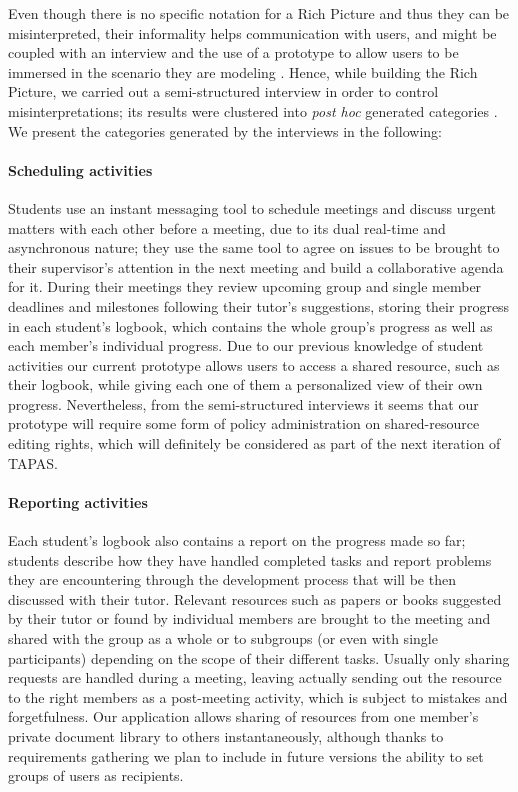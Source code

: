 Even though there is no specific notation for a Rich Picture and thus they can be misinterpreted, their informality helps communication with users, and might be coupled with an interview and the use of a prototype to allow users to be immersed in the scenario they are modeling \cite{Sutcliffe:2002:URE:581174}. Hence, while building the Rich Picture, we carried out a semi-structured interview in order to control misinterpretations; its results were clustered into \emph{post hoc} generated categories \cite{Pandit:1996um}. We present the categories generated by the interviews in the following:

\paragraph{Scheduling activities} Students use an instant messaging tool to schedule meetings and discuss urgent matters with each other before a meeting, due to its dual real-time and asynchronous nature; they use the same tool to agree on issues to be brought to their supervisor's attention in the next meeting and build a collaborative agenda for it. During their meetings they review upcoming group and single member deadlines and milestones following their tutor's suggestions, storing their progress in each student's logbook, which contains the whole group's progress as well as each member's individual progress. Due to our previous knowledge of student activities our current prototype allows users to access a shared resource, such as their logbook, while giving each one of them a personalized view of their own progress. Nevertheless, from the semi-structured interviews it seems that our prototype will require some form of policy administration on shared-resource editing rights, which will definitely be considered as part of the next iteration of \acs{TAPAS}.

\paragraph{Reporting activities} Each student's logbook also contains a report on the progress made so far; students describe how they have handled completed tasks and report problems they are encountering through the development process that will be then discussed with their tutor. Relevant resources such as papers or books suggested by their tutor or found by individual members are brought to the meeting and shared with the group as a whole or to subgroups (or even with single participants) depending on the scope of their different tasks. Usually only sharing requests are handled during a meeting, leaving actually sending out the resource to the right members as a post-meeting activity, which is subject to mistakes and forgetfulness. Our application allows sharing of resources from one member's private document library to others instantaneously, although thanks to requirements gathering we plan to include in future versions the ability to set groups of users as recipients.

